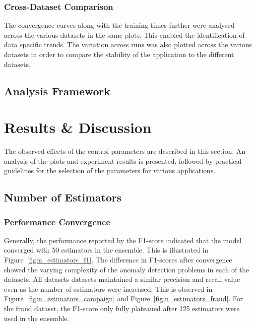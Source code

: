 \documentclass[10pt, conference]{IEEEtran}
\begin{document}
\subsubsection{Cross-Dataset Comparison}
The convergence curves along with the training times further were analysed across the various datasets in the same plots. This enabled the identification of data specific trends. The variation across runs was also plotted across the various datasets in order to compare the stability of the application to the different datasets.

\subsection{Analysis Framework}









\section{Results \& Discussion}
The observed effects of the control parameters are described in this section. An analysis of the plots and experiment results is presented, followed by practical guidelines for the selection of the parameters for various applications.
\subsection{Number of Estimators}
\subsubsection{Performance Convergence}
Generally, the performance reported by the F1-score indicated that the model converged with 50 estimators in the ensemble. This is illustrated in Figure~\ref{fig:n_estimators_f1}. The difference in F1-scores after convergence showed the varying complexity of the anomaly detection problems in each of the datasets. All datasets datasets maintained a similar precision and recall value even as the number of estimators were increased. This is observed in Figure~\ref{fig:n_estimators_campaign} and Figure~\ref{fig:n_estimators_fraud}. For the fraud dataset, the F1-score only fully plateaued after 125 estimators were used in the ensemble. 
\end{document}
